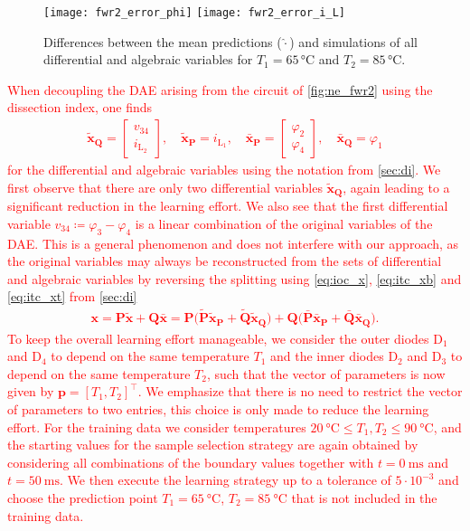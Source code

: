\documentclass[AMA,STIX1COL]{WileyNJD-v2}
\newcommand{\mb}[1]{\mathbf{#1}}
\newcommand{\mbt}[1]{\tilde{\mathbf{#1}}}
\newcommand{\mbb}[1]{\bar{\mathbf{#1}}}
\newcommand{\mr}[1]{\mathrm{#1}}
\newcommand{\T}{{\!\top}}
\begin{document}
\begin{figure}[b]
    \begin{center}
        \texttt{[image: fwr2\_error\_phi]} \hspace{1.5cm} \texttt{[image: fwr2\_error\_i\_L]}
    \end{center}
    \caption{Differences between the mean predictions ($\hat{\cdot}$) and simulations of all differential and algebraic variables for $T_1 = 65\, \si{\celsius}$ and $T_2 = 85\, \si{\celsius}$.}
    \label{fig:ne_fwr2_error}
\end{figure}
\textcolor{red}{When decoupling the DAE arising from the circuit of \autoref{fig:ne_fwr2} using the dissection index, one finds
\begin{align*}
    \mbt{x}_\mb{Q} = \begin{bmatrix}
        v_{34}\\
        i_{\mr{L}_2}
    \end{bmatrix}, \quad \mbt{x}_\mb{P} = i_{\mr{L}_1}, \quad \mbb{x}_\mb{P} = \begin{bmatrix}
        \varphi_2\\
        \varphi_4
    \end{bmatrix}, \quad \mbb{x}_\mb{Q} = \varphi_1
\end{align*}
for the differential and algebraic variables using the notation from \autoref{sec:di}. We first observe that there are only two differential variables $\mbt{x}_\mb{Q}$, again leading to a significant reduction in the learning effort. We also see that the first differential variable $v_{34} \coloneqq \varphi_3 - \varphi_4$ is a linear combination of the original variables of the DAE. This is a general phenomenon and does not interfere with our approach, as the original variables may always be reconstructed from the sets of differential and algebraic variables by reversing the splitting using \eqref{eq:ioc_x}, \eqref{eq:itc_xb} and \eqref{eq:itc_xt} from \autoref{sec:di}
\begin{align*}
    \mb{x} = \mb{P} \mbt{x} + \mb{Q} \mbb{x} = \mb{P} \big( \mbt{P} \mbt{x}_\mb{P} + \mbt{Q} \mbt{x}_\mb{Q} \big) + \mb{Q} \big( \mbb{P} \mbb{x}_\mb{P} + \mbb{Q} \mbb{x}_\mb{Q} \big).
\end{align*}
To keep the overall learning effort manageable, we consider the outer diodes $\mr{D}_1$ and $\mr{D}_4$ to depend on the same temperature $T_1$ and the inner diodes $\mr{D}_2$ and $\mr{D}_3$ to depend on the same temperature $T_2$, such that the vector of parameters is now given by $\mb{p} = [T_1, T_2]^\T$. We emphasize that there is no need to restrict the vector of parameters to two entries, this choice is only made to reduce the learning effort. For the training data we consider temperatures $\SI{20}{\celsius} \leq T_1, T_2 \leq \SI{90}{\celsius}$, and the starting values for the sample selection strategy are again obtained by considering all combinations of the boundary values together with $t = \SI{0}{\ms}$ and $t = \SI{50}{\ms}$. We then execute the learning strategy up to a tolerance of $5 \cdot 10^{-3}$ and choose the prediction point $T_1 = \SI{65}{\celsius}$, $T_2 = \SI{85}{\celsius}$ that is not included in the training data.}
\end{document}

